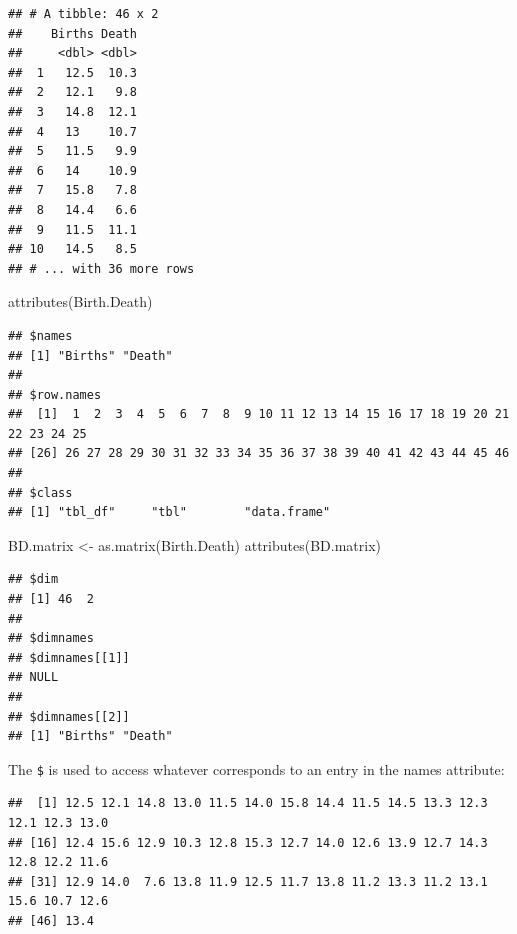 \documentclass[
]{book}
\newenvironment{Shaded}{\begin{snugshade}}{\end{snugshade}}
\newcommand{\FunctionTok}[1]{\textcolor[rgb]{0.00,0.00,0.00}{#1}}
\newcommand{\NormalTok}[1]{#1}
\newcommand{\OtherTok}[1]{\textcolor[rgb]{0.56,0.35,0.01}{#1}}
\newcommand{\SpecialCharTok}[1]{\textcolor[rgb]{0.00,0.00,0.00}{#1}}
\begin{document}
\begin{verbatim}
## # A tibble: 46 x 2
##    Births Death
##     <dbl> <dbl>
##  1   12.5  10.3
##  2   12.1   9.8
##  3   14.8  12.1
##  4   13    10.7
##  5   11.5   9.9
##  6   14    10.9
##  7   15.8   7.8
##  8   14.4   6.6
##  9   11.5  11.1
## 10   14.5   8.5
## # ... with 36 more rows
\end{verbatim}

\begin{Shaded}
\begin{Highlighting}[]
\FunctionTok{attributes}\NormalTok{(Birth.Death)}
\end{Highlighting}
\end{Shaded}

\begin{verbatim}
## $names
## [1] "Births" "Death" 
## 
## $row.names
##  [1]  1  2  3  4  5  6  7  8  9 10 11 12 13 14 15 16 17 18 19 20 21 22 23 24 25
## [26] 26 27 28 29 30 31 32 33 34 35 36 37 38 39 40 41 42 43 44 45 46
## 
## $class
## [1] "tbl_df"     "tbl"        "data.frame"
\end{verbatim}

\begin{Shaded}
\begin{Highlighting}[]
\NormalTok{BD.matrix }\OtherTok{\textless{}{-}} \FunctionTok{as.matrix}\NormalTok{(Birth.Death)}
\FunctionTok{attributes}\NormalTok{(BD.matrix)}
\end{Highlighting}
\end{Shaded}

\begin{verbatim}
## $dim
## [1] 46  2
## 
## $dimnames
## $dimnames[[1]]
## NULL
## 
## $dimnames[[2]]
## [1] "Births" "Death"
\end{verbatim}

The \texttt{\$} is used to access whatever corresponds to an entry in the names attribute:

\begin{Shaded}
\end{Shaded}

\begin{verbatim}
##  [1] 12.5 12.1 14.8 13.0 11.5 14.0 15.8 14.4 11.5 14.5 13.3 12.3 12.1 12.3 13.0
## [16] 12.4 15.6 12.9 10.3 12.8 15.3 12.7 14.0 12.6 13.9 12.7 14.3 12.8 12.2 11.6
## [31] 12.9 14.0  7.6 13.8 11.9 12.5 11.7 13.8 11.2 13.3 11.2 13.1 15.6 10.7 12.6
## [46] 13.4
\end{verbatim}
\end{document}
